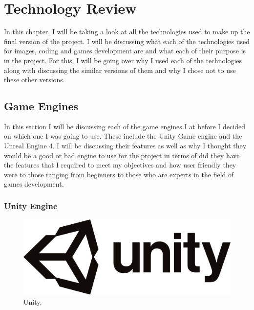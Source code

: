\chapter{Technology Review}
In this chapter, I will be taking a look at all the technologies used to make up the final version of the project. I will be discussing what each of the technologies used for images, coding and games development are and what each of their purpose is in the project. For this, I will be going over why I used each of the technologies along with discussing the similar versions of them and why I chose not to use these other versions.

\section{Game Engines}
In this section I will be discussing each of the game engines I at before I decided on which one I was going to use. These include the Unity Game engine and the Unreal Engine 4. I will be discussing their features as well as why I thought they would be a good or bad engine to use for the project in terms of did they have the features that I required to meet my objectives and how user friendly they were to those ranging from beginners to those who are experts in the field of games development.\cite{GameEngines}
\newpage
\subsection{Unity Engine}
\begin{figure}[h]
  \includegraphics[width=\linewidth]{Images/UnityLogo.png}
  \caption{Unity.}
  \label{fig:Unity}
\end{figure}
\bigskip



